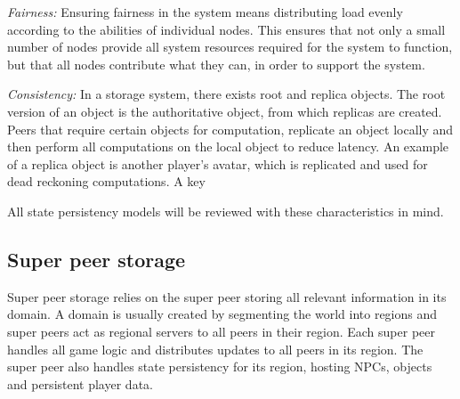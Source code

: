 \documentclass[10pt,a4paper,journal,cspaper,compsoc]{IEEEtran}
\begin{document}
\emph{Fairness:} Ensuring fairness in the system means distributing load evenly according to the abilities of individual nodes. This ensures that
    not only a small number of nodes provide all system resources required for the system to function, but that all nodes contribute what they
    can, in order to support the system.

\emph{Consistency:} In a storage system, there exists root and replica objects. The root version of an object is the authoritative object, from which
replicas are created. Peers that require certain objects for computation, replicate an object locally and then perform all computations on the local
object to reduce latency. An example of a replica object is another player's avatar, which is replicated and used for dead reckoning computations. A
key

All state persistency models will be reviewed with these characteristics in mind.

\subsection{Super peer storage}
\label{super_peer_storage}

Super peer storage relies on the super peer storing all relevant information in its domain. A domain is usually created by segmenting the world into
regions and super peers act as regional servers to all peers in their region. Each super peer handles all game logic and distributes updates to all
peers in its region. The super peer also handles state persistency for its region, hosting NPCs, objects and persistent player data.
\end{document}
